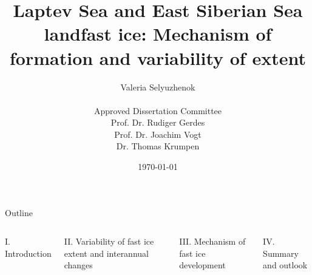 \documentclass[8pt]{beamer}
\title{Laptev Sea and East Siberian Sea landfast ice: Mechanism of formation and variability of extent}
\date{\today}
\author{Valeria Selyuzhenok\\~\\\textsf {Approved Dissertation Committee}\\
	\textsf{Prof. Dr. Rudiger Gerdes}\\ 
	\textsf{Prof. Dr. Joachim Vogt}\\ 	
	\textsf{Dr. Thomas Krumpen}\\ }
\institute{Jacobs University Bremen}
\begin{document}
\maketitle

	
\setwatermark{\fontsize{125pt}{125pt}\selectfont{}}
\begin{frame}{Outline}
	\begin{columns}
		\begin{block}{I. Introduction}
		\end{block}
		\begin{block}{II. Variability of fast ice extent and interannual changes}
		\end{block}
		\begin{block}{III. Mechanism of fast ice development}
		\end{block}
		\begin{block}{IV. Summary and outlook} 
		\end{block}
	\end{columns}
\end{frame}
\end{document}
